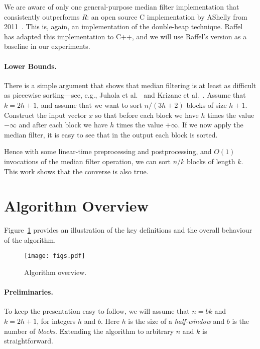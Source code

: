 \documentclass[a4paper,11pt]{article}
\begin{document}
We are aware of only one general-purpose median filter implementation that consistently outperforms \emph{R}: an open source C implementation by AShelly from 2011~. This is, again, an implementation of the double-heap technique. Raffel~ has adapted this implementation to C++, and we will use Raffel's version as a baseline in our experiments.


\paragraph{Lower Bounds.}

There is a simple argument that shows that median filtering is at least as difficult as piecewise sorting---see, e.g., Juhola et al.~\cite{juhola91comparison} and Krizanc et al.~\cite{krizanc05range-mode}. Assume that $k = 2h+1$, and assume that we want to sort $n / (3h+2)$ blocks of size $h+1$. Construct the input vector $x$ so that before each block we have $h$ times the value $-\infty$ and after each block we have $h$ times the value $+\infty$. If we now apply the median filter, it is easy to see that in the output each block is sorted.

Hence with some linear-time preprocessing and postprocessing, and $O(1)$ invocations of the median filter operation, we can sort $n/k$ blocks of length $k$. This work shows that the converse is also true.


\section{Algorithm Overview}

Figure~\ref{fig:overview} provides an illustration of the key definitions and the overall behaviour of the algorithm.

\begin{figure}
    \centering
    \texttt{[image: figs.pdf]}
    \caption{Algorithm overview.}\label{fig:overview}
\end{figure}


\paragraph{Preliminaries.}
To keep the presentation easy to follow, we will assume that $n = bk$ and $k = 2h + 1$, for integers $h$ and $b$. Here $h$ is the size of a \emph{half-window} and $b$ is the number of \emph{blocks}. Extending the algorithm to arbitrary $n$ and $k$ is straightforward.
\end{document}
